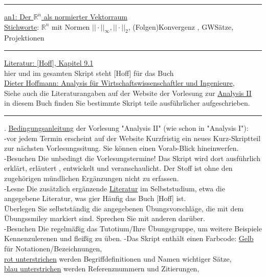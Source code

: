 \documentclass[11pt]{article}
\newcommand{\redcircle}[1]{%
	\tikz[baseline=(char.base)]{
		\node[shape=circle, draw=red, text=red, thick, inner sep=1pt] (char) {\textbf{#1}};
	}%
}
\begin{document}
	
	\Large
	
	
	
	
	
	\medskip\hrule\medskip
	\underline{an1: Der $\mathbb{R}^n$ als normierter Vektorraum}\\
	\underline{Stichworte}: $\mathbb{R}^n$ mit Normen $||\cdot||_{\infty}, ||\cdot||_2$, (Folgen)Konvergenz , GWSätze, Projektionen\\
	\medskip\hrule\medskip
	\underline{Literatur: [Hoff], Kapitel 9.1}\\
	hier  und im gesamten Skript steht [Hoff] für das Buch\\
	\underline{Dieter Hoffmann: Analysis für Wirtschaftswissenschaftler und Ingenieure},\\
	Siehe auch die Literaturangaben auf der Website der Vorlesung zur \href{https://www.math.uni-duesseldorf.de/~internet/Ana2_SoSe25/#veranstaltungen}{Analysis II}\\
	in diesem Buch finden Sie bestimmte Skript teile ausführlicher aufgeschrieben.\\
	\medskip\hrule{}. \underline{Bedingungsanleitung} der Vorlesung "Analysis II" (wie schon in "Analysis I"):\\
	-vor jedem Termin erscheint auf der Website Kurzfristig ein neues Kurz-Skriptteil zur nächsten Vorlesungssitung. Sie können einen Vorab-Blick hineinwerfen.\\
	-Besuchen Die unbedingt die Vorlesungstermine! Das Skript wird dort ausführlich erklärt, erläutert , entwickelt und veranschaulicht. Der Stoff ist ohne den zugehörigen mündlichen Ergänzungen nicht zu erfassen.\\
	-Lesne Die zusätzlich ergänzende \underline{Literatur} im Selbststudium, etwa die angegebene Literatur, was gier Häufig das Buch [Hoff] ist.\\
	Überlegen Sie selbstständig die angegebenen Übungsvorschläge, die mit dem Übungssmiley \redcircle{Ü} markiert sind. Sprechen Sie mit anderen darüber.\\
	-Besuchen Die regelmäßig das Tutotium/Ihre Übungsgruppe, um weitere Beispiele Kennenzulerenen und fleißig zu üben.
	-Das Skript enthält einen Farbcode: \ul{Gelb} für Notationen/Bezeichnungen,\\
	\ul{rot unterstrichen} werden Begriffdefinitionen und Namen wichtiger Sätze,\\
	\ul{blau unterstrichen} werden Referenznummern und Zitierungen,\\
\end{document}
